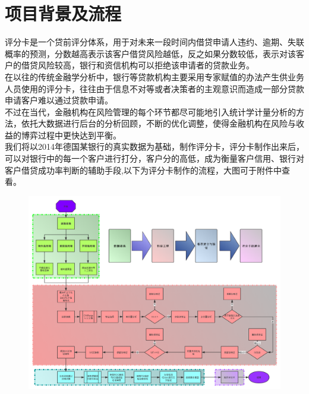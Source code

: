 \documentclass[12pt]{article}
\begin{document}
\section{项目背景及流程}


\begin{flushleft}
	\noindent\qquad 评分卡是一个贷前评分体系，用于对未来一段时间内借贷申请人违约、逾期、失联概率的预测，分数越高表示该客户借贷风险越低，反之如果分数较低，表示对该客户的借贷风险较高，银行和资信机构可以拒绝该申请者的贷款业务。\\
	\noindent\qquad 在以往的传统金融学分析中，银行等贷款机构主要采用专家赋值的办法产生供业务人员使用的评分卡，往往由于信息不对等或者决策者的主观意识而造成一部分贷款申请客户难以通过贷款申请。\\
	\noindent\qquad 不过在当代，金融机构在风险管理的每个环节都尽可能地引入统计学计量分析的方法，依托大数据进行后台的分析回顾，不断的优化调整，使得金融机构在风险与收益的博弈过程中更快达到平衡。\\
	\noindent\qquad 我们将以2014年德国某银行的真实数据为基础，制作评分卡，评分卡制作出来后，可以对银行中的每一个客户进行打分，客户分的高低，成为衡量客户信用、银行对客户借贷成功率判断的辅助手段,以下为评分卡制作的流程，大图可于附件中查看。
\end{flushleft}






\begin{figure}[H]
	\centering
	\includegraphics[width=1\linewidth]{figures/思维导图2.0}
	\caption{}
	
\end{figure}
\end{document}

